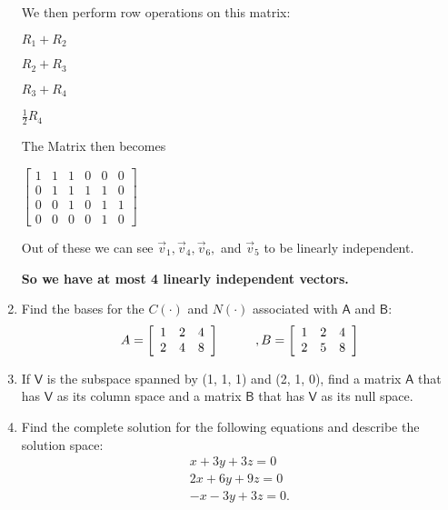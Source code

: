 \documentclass[a4paper, 11pt]{article}
\newcommand{\mat}[1]{\boldsymbol { \mathsf{#1}} }
\begin{document}
\begin{enumerate}
\begin{center}
\end{center}

We then perform row operations on this matrix:
\begin{center}
$R_1 + R_2$

$R_2 + R_3$

$R_3 + R_4$

$\frac{1}{2} R_4$
\end{center}

The Matrix then becomes 

\begin{center}
$
\begin{bmatrix}
1 & 1 & 1 & 0 & 0 & 0 \\
0 & 1 & 1 & 1 & 1 & 0\\
0 & 0 & 1 & 0 & 1 & 1\\ 
0 & 0 & 0 & 0 & 1 & 0 
\end{bmatrix}
$
\end{center}

Out of these we can see $\vec v_1, \vec v_4, \vec v_6,$ and $\vec v_5$ to be linearly independent.

\textbf{So we have at most 4 linearly independent vectors.}


\item Find the bases for the $C(\mat \cdot)$ and $N(\mat \cdot)$ associated with $\mat A$ and $\mat B$:
\[ A = \left[ \begin{array}{ccc}
1&2&4\\
2&4&8
\end{array} \right]
\hspace{10mm}, B = \left[ \begin{array}{ccc}
1&2&4\\
2&5&8
\end{array} \right]\]

\item If $\mat V$ is the subspace spanned by (1, 1, 1) and (2, 1, 0), find a matrix $\mat A$ that has $\mat V$ as its column space and a matrix $\mat B$ that has $\mat V$ as its null space.


\item Find the complete solution for the following equations and describe the solution space:
\begin{equation} \label{eq1}
\begin{split}
x + 3y + 3z  = 0\\
2x + 6y + 9z = 0\\
-x - 3y +3z  = 0.
\end{split}
\end{equation}
\end{enumerate}
\end{document}
